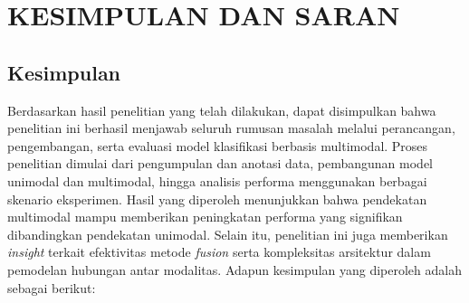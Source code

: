 \newpage
\chapter{KESIMPULAN DAN SARAN} \label{Bab V}

\section{Kesimpulan} \label{V.Kesimpulan}
Berdasarkan hasil penelitian yang telah dilakukan, dapat disimpulkan bahwa penelitian ini berhasil menjawab seluruh rumusan masalah melalui perancangan, pengembangan, serta evaluasi model klasifikasi berbasis multimodal. Proses penelitian dimulai dari pengumpulan dan anotasi data, pembangunan model unimodal dan multimodal, hingga analisis performa menggunakan berbagai skenario eksperimen. Hasil yang diperoleh menunjukkan bahwa pendekatan multimodal mampu memberikan peningkatan performa yang signifikan dibandingkan pendekatan unimodal. Selain itu, penelitian ini juga memberikan \textit{insight} terkait efektivitas metode \textit{fusion} serta kompleksitas arsitektur dalam pemodelan hubungan antar modalitas. Adapun kesimpulan yang diperoleh adalah sebagai berikut:

